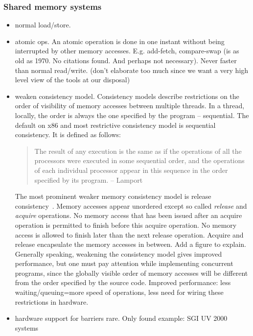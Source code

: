 \documentclass[a4paper, 10pt]{article}
\begin{document}
\subsubsection{Shared memory systems}
\label{sssec:existing-means-shared}
\begin{itemize}
	\item normal load/store.
	\item atomic ops. An atomic operation is done in one instant without being interrupted by other memory accesses. E.g. add-fetch, compare-swap (is as old as 1970. No citations found. And perhaps not necessary). Never faster than normal read/write. (don't elaborate too much since we want a very high level view of the tools at our disposal)
	\item weaken consistency model. Consistency models describe restrictions on the order of visibility of memory accesses between multiple threads. In a thread, locally, the order is always the one specified by the program -- sequential. The default on x86 and most restrictive consistency model is sequential consistency. It is defined as follows:
		\begin{quote}
			The result of any execution is the same as if the operations of all the processors were executed in some sequential order, and the operations of each individual processor appear in this sequence in the order specified by its program. -- Lamport~\cite{sequentialconsistency}
		\end{quote}
		The most prominent weaker memory consistency model is release consistency~\cite{gha90}. Memory accesses appear unordered except so called \emph{release} and \emph{acquire} operations. No memory access that has been issued after an acquire operation is permitted to finish before this acquire operation. No memory access is allowed to finish later than the next release operation. Acquire and release encapsulate the memory accesses in between. Add a figure to explain. Generally speaking, weakening the consistency model gives improved performance, but one must pay attention while implementing concurrent programs, since the globally visible order of memory accesses will be different from the order specified by the source code. Improved performance: less waiting/queuing=more speed of operations, less need for wiring these restrictions in hardware.
	\item hardware support for barriers rare. Only found example: SGI UV 2000 systems\cite{sgiuv2000}
\end{itemize}
\end{document}
